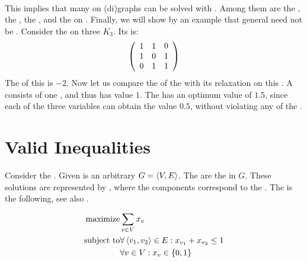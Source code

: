\paragraph{}
This implies that many  on (di)graphs can be solved with . Among them are the , the , the , and the  on . Finally, we will show by an example that general  need not be . Consider the  on three  $K_3$. Its  is:
\begin{equation}
\left( \begin{array}{ccc}
1&1&0\\
1&0&1\\
0&1&1
\end{array} \right)
\end{equation}
The  of this  is $-2$. Now let us compare the   of the  with its  relaxation on this . A  consists of one , and thus has value $1$. The  has an optimum value of $1.5$, since each of the three variables can obtain the value $0.5$, without violating any of the .

\section{Valid Inequalities}
Consider the . Given is an arbitrary  $G=\left\langle V,E \right\rangle$. The  are the  in $G$. These solutions are represented by , where the components correspond to the . The   is the following, see also .

\begin{eqnarray}
\mbox{maximize}&\sumdomain[v]{V}{x_v}\eqnlab{stablesetr-m}\\
\mbox{subject to}&\forall\tupl{v_1,v_2}\in E:x_{v_1}+x_{v_2}\leq 1\eqnlab{stablesetr-c1}\\
&\forall v\in V:x_v\in\accl{0,1}\eqnlab{stablesetr-c2}
\end{eqnarray}

